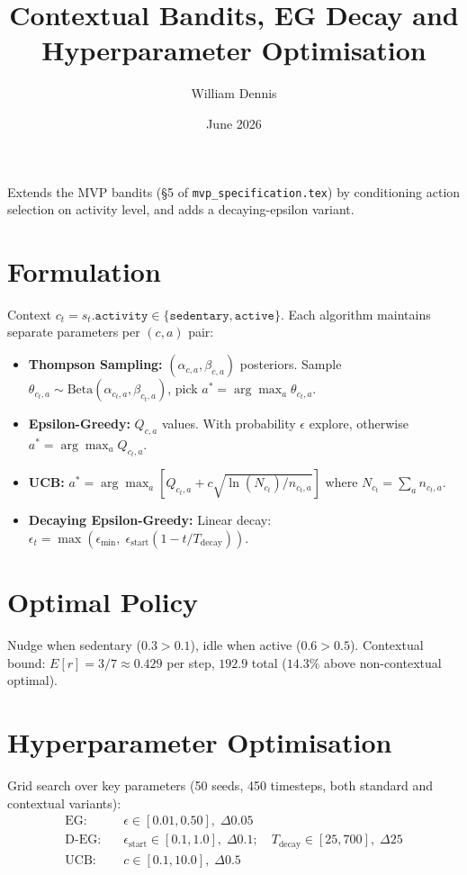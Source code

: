 \documentclass[11pt]{article}
\title{Contextual Bandits, EG Decay and Hyperparameter Optimisation}
\author{William Dennis}
\date{June 2026}
\begin{document}
\maketitle

Extends the MVP bandits (\S5 of \texttt{mvp\_specification.tex}) by conditioning action selection on activity level, and adds a decaying-epsilon variant.

\section{Formulation}
Context $c_t = s_t.\texttt{activity} \in \{\texttt{sedentary}, \texttt{active}\}$. Each algorithm maintains separate parameters per $(c, a)$ pair:

\begin{itemize}
  \item \textbf{Thompson Sampling:} $(\alpha_{c,a}, \beta_{c,a})$ posteriors. Sample $\theta_{c_t, a} \sim \text{Beta}(\alpha_{c_t, a}, \beta_{c_t, a})$, pick $a^* = \arg\max_a \theta_{c_t, a}$.
  \item \textbf{Epsilon-Greedy:} $Q_{c,a}$ values. With probability $\epsilon$ explore, otherwise $a^* = \arg\max_a Q_{c_t, a}$.
  \item \textbf{UCB:} $a^* = \arg\max_a \left[ Q_{c_t, a} + c \sqrt{\ln(N_{c_t}) / n_{c_t, a}} \right]$ where $N_{c_t} = \sum_a n_{c_t, a}$.
  \item \textbf{Decaying Epsilon-Greedy:} Linear decay: $\epsilon_t = \max(\epsilon_{\min},\; \epsilon_{\text{start}} (1 - t / T_{\text{decay}}))$.
\end{itemize}

\section{Optimal Policy}
Nudge when sedentary ($0.3 > 0.1$), idle when active ($0.6 > 0.5$). Contextual bound: $E[r] = 3/7 \approx 0.429$ per step, $192.9$ total ($14.3\%$ above non-contextual optimal).

\section{Hyperparameter Optimisation}
Grid search over key parameters (50 seeds, 450 timesteps, both standard and contextual variants):
\[
\begin{aligned}
\text{EG:} &\quad \epsilon \in [0.01, 0.50], \; \Delta 0.05 \\
\text{D-EG:} &\quad \epsilon_{\text{start}} \in [0.1, 1.0], \; \Delta 0.1; \quad T_{\text{decay}} \in [25, 700], \; \Delta 25 \\
\text{UCB:} &\quad c \in [0.1, 10.0], \; \Delta 0.5
\end{aligned}
\]
\end{document}
